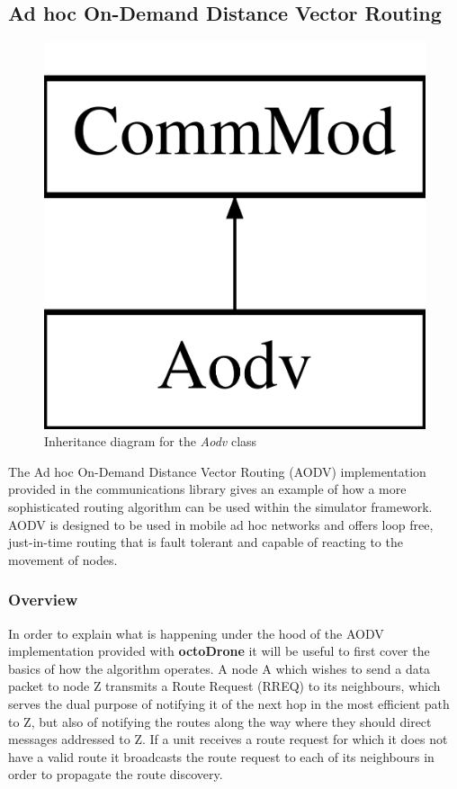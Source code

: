 \subsection{Ad hoc On-Demand Distance Vector Routing}
\begin{figure}[H]
\centering	
\includegraphics[scale=0.2]{../documentation/latex/class_aodv}	
\caption{Inheritance diagram for the \textit{Aodv} class}
\end{figure}

The Ad hoc On-Demand Distance Vector Routing (AODV) implementation provided in the communications library gives an example of how a more sophisticated routing algorithm can be used within the simulator framework. AODV is designed to be used in mobile ad hoc networks and offers loop free, just-in-time routing that is fault tolerant and capable of reacting to the movement of nodes.

\subsubsection{Overview}
\label{AODVdesc}
In order to explain what is happening under the hood of the AODV implementation provided with \textbf{octoDrone} it will be useful to first cover the basics of how the algorithm operates\cite{perkins2003}. A node A which wishes to send a data packet to node Z transmits a Route Request (RREQ) to its neighbours, which serves the dual purpose of notifying it of the next hop in the most efficient path to Z, but also of notifying the routes along the way where they should direct messages addressed to Z. If a unit receives a route request for which it does not have a valid route it broadcasts the route request to each of its neighbours in order to propagate the route discovery. 

